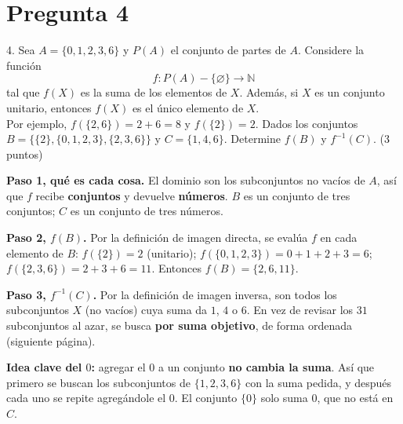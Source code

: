\documentclass[11pt]{article}
\begin{document}
\clearpage
\section*{Pregunta 4}

4. Sea $A=\{0,1,2,3,6\}$ y $P(A)$ el conjunto de partes de $A$. Considere la función
\[f:P(A)-\{\varnothing\}\longrightarrow\mathbb N\]
tal que \colorbox{green!35}{$f(X)$ es la suma de los elementos de $X$}. Además, si $X$ es un conjunto unitario, entonces $f(X)$ es el único elemento de $X$.\\
Por ejemplo, $f(\{2,6\})=2+6=8$ y $f(\{2\})=2$. Dados los conjuntos\\
$B=\{\{2\},\{0,1,2,3\},\{2,3,6\}\}$ y $C=\{1,4,6\}$. Determine \colorbox{green!35}{$f(B)$ y $f^{-1}(C)$}. \hfill (3 puntos)

\begin{center}
\end{center}


\begin{explica}
\textbf{Paso 1, qué es cada cosa.} El dominio son los subconjuntos no vacíos de $A$, así que $f$ recibe \textbf{conjuntos} y devuelve \textbf{números}. $B$ es un conjunto de tres conjuntos; $C$ es un conjunto de tres números.

\textbf{Paso 2, $f(B)$.} Por la definición de imagen directa, se evalúa $f$ en cada elemento de $B$: $f(\{2\})=2$ (unitario); $f(\{0,1,2,3\})=0+1+2+3=6$; $f(\{2,3,6\})=2+3+6=11$. Entonces $f(B)=\{2,6,11\}$.

\textbf{Paso 3, $f^{-1}(C)$.} Por la definición de imagen inversa, son todos los subconjuntos $X$ (no vacíos) cuya suma da $1$, $4$ o $6$. En vez de revisar los $31$ subconjuntos al azar, se busca \textbf{por suma objetivo}, de forma ordenada (siguiente página).

\textbf{Idea clave del $0$:} agregar el $0$ a un conjunto \textbf{no cambia la suma}. Así que primero se buscan los subconjuntos de $\{1,2,3,6\}$ con la suma pedida, y después cada uno se repite agregándole el $0$. El conjunto $\{0\}$ solo suma $0$, que no está en $C$.
\end{explica}
\end{document}
